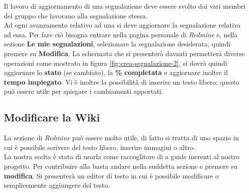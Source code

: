 \documentclass{scalatekids-article}
\begin{document}
    Il lavoro di aggiornamento di una segnalazione deve essere svolto dai vari
    membri del gruppo che lavorano alla segnalazione stessa.\\ Ad ogni avanzamento
    relativo ad una  si deve aggiornare la segnalazione relativa ad
    essa. Per fare ciò bisogna entrare nella pagina personale di \textit{Redmine} e,
    nella sezione \textbf{Le mie segnalazioni}, selezionare la segnalazione
    desiderata, quindi premere su \textbf{Modifica}. La schermata che si presenterà
    davanti permetterà diverse operazioni come mostrato in figura
    \ref{fig:crea-segnalazione-2}, si dovrà quindi aggiornare lo \textbf{stato} (se
    cambiato), la \textbf{\% completata} e aggiornare inoltre il \textbf{tempo
    impiegato}. Vi è inoltre la possibilità di inserire un testo libero; questo
    può essere utile per spiegare i cambiamenti apportati.

    \subsection{Modificare la Wiki}

    La sezione  di \textit{Redmine} può essere molto utile, di fatto si tratta di uno spazio in cui è possibile scrivere del testo libero, inserire immagini o altro.\\
    La nostra scelta è stata di usarla come raccoglitore di  a guide inerenti al nostro progetto.
    Per contribuire alla  basta andare nella suddetta sezione e premere su \textbf{modifica}. Si presenterà un editor di testo in cui è possibile modificare o semplicemente aggiungere del testo.

    \listoffigures

    
\end{document}
